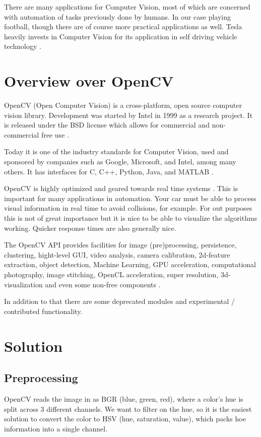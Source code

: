 \documentclass[12pt, a4paper]{article}
\begin{document}
There are many applications for Computer Vision, most of which are concerned with automation of tasks previously done by humans. In our case playing football, though there are of course more practical applications as well.
Tesla heavily invests in Computer Vision for its application in self driving vehicle technology \cite{teslaAutopilot} \cite{teslaCVArticle}.

\section{Overview over OpenCV}
OpenCV (Open Computer Vision) is a cross-platform, open source computer vision library. Development was started by Intel in 1999 as a research project. It is released under the BSD license which allows for commercial and non-commercial free use \cite{learningOpenCV}.

Today it is one of the industry standards for Computer Vision, used and sponsored by companies such as Google, Microsoft, and Intel, among many others. It has interfaces for C, C++, Python, Java, and MATLAB \cite{aboutOpenCV}.

OpenCV is highly optimized and geared towards real time systems \cite{aboutOpenCV}. This is important for many applications in automation. Your car must be able to process visual information in real time to avoid collisions, for example.
For out purposes this is not of great importance but it is nice to be able to visualize the algorithms working. Quicker response times are also generally nice.

The OpenCV API provides facilities for image (pre)processing, persistence, clustering, hight-level GUI, video analysis, camera calibration, 2d-feature extraction, object detection, Machine Learning, GPU acceleration, computational photography, image stitching, OpenCL acceleration, super resolution, 3d-visualization and even some non-free components \cite{openCVNonFree}.

In addition to that there are some deprecated modules and experimental / contributed functionality. \cite{openCVRefMan}

\section{Solution}
\subsection{Preprocessing}
OpenCV reads the image in as BGR (blue, green, red), where a color's hue is split across 3 different channels. We want to filter on the hue, so it is the easiest solution to convert the color to HSV (hue, saturation, value), which packs hoe information into a single channel.
\end{document}
